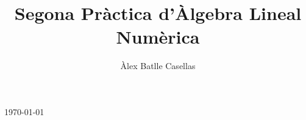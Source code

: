 \documentclass[11pt]{article}
\title{Segona Pràctica d'Àlgebra Lineal Numèrica}
\author{Àlex Batlle Casellas}
\begin{document}
\maketitle
{\large \today\par}
\newpage
\end{document}
